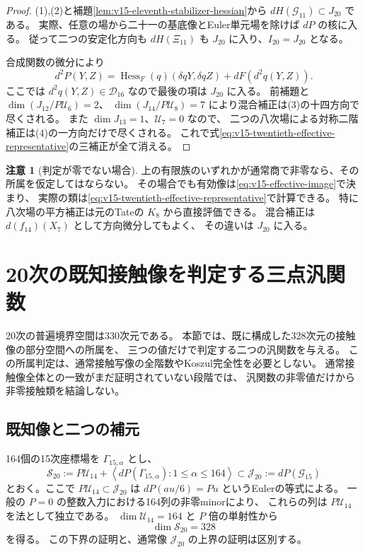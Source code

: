 \documentclass[a4paper,11pt]{ltjsarticle}
\theoremstyle{definition}
\newtheorem{remark}[theorem]{注意}
\begin{document}
\begin{proof}
(1),(2)と補題\ref{lem:v15-eleventh-stabilizer-hessian}から
$dH(\mathcal G_{11})\subset J_{20}$ である。
実際、任意の場から二十一の基底像とEuler単元場を除けば $dP$ の核に入る。
従って二つの安定化方向も $dH(\Xi_{11})$ も $J_{20}$ に入り、$I_{20}=J_{20}$ となる。

合成関数の微分により
\[
 d^2P(Y,Z)=\operatorname{Hess}_F(q)(\delta qY,\delta qZ)
                      +dF(d^2q(Y,Z)).
\]
ここでは $d^2q(Y,Z)\in\mathcal D_{16}$ なので最後の項は $J_{20}$ に入る。
前補題と $\dim(J_{12}/P\mathcal U_6)=2$、
$\dim(J_{14}/P\mathcal U_8)=7$ により混合補正は(3)の十四方向で尽くされる。
また $\dim J_{13}=1$、$\mathcal U_7=0$ なので、
二つの八次場による対称二階補正は(4)の一方向だけで尽くされる。
これで式\eqref{eq:v15-twentieth-effective-representative}の三補正が全て消える。
\end{proof}

\begin{remark}[判定が零でない場合]
上の有限族のいずれかが通常商で非零なら、その所属を仮定してはならない。
その場合でも有効像は\eqref{eq:v15-effective-image}で決まり、
実際の類は\eqref{eq:v15-twentieth-effective-representative}で計算できる。
特に八次場の平方補正は元のTateの $K_8$ から直接評価できる。
混合補正は $d(f_{14})(X_7)$ として方向微分してもよく、
その違いは $J_{20}$ に入る。
\end{remark}



\section{20次の既知接触像を判定する三点汎関数}
\label{sec:v15-three-point-detectors}

20次の普遍境界空間は330次元である。
本節では、既に構成した328次元の接触像の部分空間への所属を、
三つの値だけで判定する二つの汎関数を与える。
この所属判定は、通常接触写像の全階数やKoszul完全性を必要としない。
通常接触像全体との一致がまだ証明されていない段階では、
汎関数の非零値だけから非零接触類を結論しない。

\subsection{既知像と二つの補元}

164個の15次座標場を $\Gamma_{15,\alpha}$ とし、
\[
 \mathcal S_{20}:=
 P\mathcal U_{14}
 +\left\langle dP(\Gamma_{15,\alpha}):1\le\alpha\le164\right\rangle
 \subset\mathcal J_{20}:=dP(\mathcal G_{15})
\]
とおく。ここで $P\mathcal U_{14}\subset\mathcal J_{20}$ は
$dP(a u/6)=Pu$ というEulerの等式による。
一般の $P=0$ の整数入力における164列の非零minorにより、
これらの列は $P\mathcal U_{14}$ を法として独立である。
$\dim\mathcal U_{14}=164$ と $P$ 倍の単射性から
\begin{equation}\label{eq:v15-known-image-dimension}
 \dim\mathcal S_{20}=328
\end{equation}
を得る。
この下界の証明と、通常像 $\mathcal J_{20}$ の上界の証明は区別する。
\end{document}
